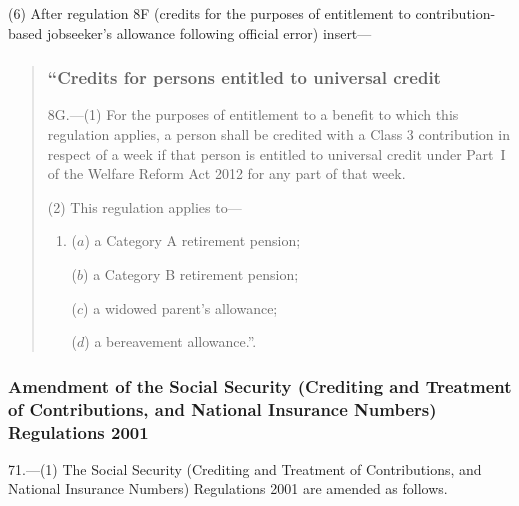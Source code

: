 \documentclass[12pt,a4paper]{article}
\begin{document}
\begin{sloppypar}
(6) After regulation 8F (credits for the purposes of entitlement to contribution-based jobseeker’s allowance following official error) insert—
\end{sloppypar}
\begin{quotation}
\subsubsection*{“Credits for persons entitled to universal credit}

8G.—(1) For the purposes of entitlement to a benefit to which this regulation applies, a person shall be credited with a Class 3 contribution in respect of a week if that person is entitled to universal credit under Part~I of the Welfare Reform Act 2012 for any part of that week.

(2) This regulation applies to—
\begin{enumerate}\item[]
($a$) a Category A retirement pension;

($b$) a Category B retirement pension;

($c$) a widowed parent’s allowance;

($d$) a bereavement allowance.”.
\end{enumerate}
\end{quotation}

\subsubsection[71. Amendment of the Social Security (Crediting and Treatment of Contributions, and National Insurance Numbers) Regulations 2001]{Amendment of the Social Security (Crediting and Treatment of Contributions, and National Insurance Numbers) Regulations 2001}

71.—(1) The Social Security (Crediting and Treatment of Contributions, and National Insurance Numbers) Regulations 2001 are amended as follows.
\end{document}
